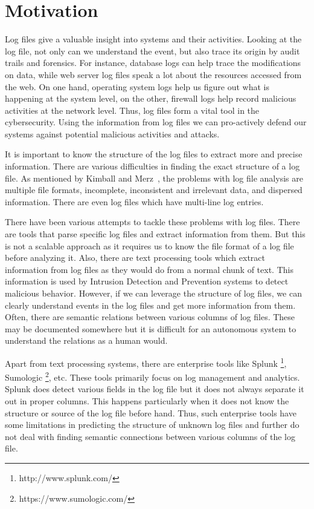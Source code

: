 \section{Motivation}

Log files give a valuable insight into systems and their activities. Looking at the log file, not only can we understand the event, but also trace its origin by audit trails and forensics. For instance, database logs can help trace the modifications on data, while web server log files speak a lot about the resources accessed from the web. On one hand, operating system logs help us figure out what is happening at the system level, on the other, firewall logs help record malicious activities at the network level. Thus, log files form a vital tool in the cybersecurity. Using the information from log files we can pro-actively defend our systems against potential malicious activities and attacks.

It is important to know the structure of the log files to extract more and precise information. There are various difficulties in finding the exact structure of a log file. As mentioned by Kimball and Merz~\cite{kimball_log_problem}, the problems with log file analysis are multiple file formats, incomplete, inconsistent and irrelevant data, and dispersed information. There are even log files which have multi-line log entries.

There have been various attempts to tackle these problems with log files. There are tools that parse specific log files and extract information from them. But this is not a scalable approach as it requires us to know the file format of a log file before analyzing it. Also, there are text processing tools which extract information from log files as they would do from a normal chunk of text. This information is used by Intrusion Detection and Prevention systems to detect malicious behavior. However, if we can leverage the structure of log files, we can clearly understand events in the log files and get more information from them. Often, there are semantic relations between various columns of log files. These may be documented somewhere but it is difficult for an autonomous system to understand the relations as a human would.

Apart from text processing systems, there are enterprise tools like Splunk \footnote{http://www.splunk.com/}, Sumologic \footnote{https://www.sumologic.com/}, etc. These tools primarily focus on log management and analytics. Splunk does detect various fields in the log file but it does not always separate it out in proper columns. This happens particularly when it does not know the structure or source of the log file before hand. Thus, such enterprise tools have some limitations in predicting the structure of unknown log files and further do not deal with finding semantic connections between various columns of the log file.


